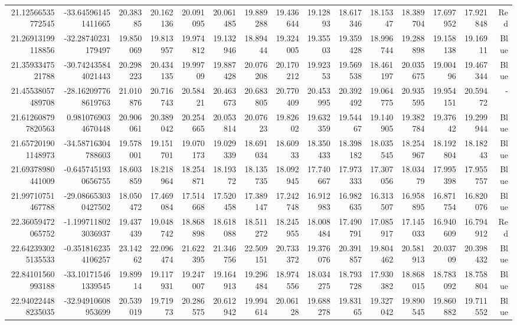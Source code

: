 \begin{center}
\begin{longtable}{rrrrrrrrrrrrrrr}
21.12566535772545 & -33.645961451411665 & 20.38385 & 20.162136 & 20.091095 & 20.061485 & 19.889288 & 19.436644 & 19.12893 & 18.617346 & 18.15347 & 18.389704 & 17.697952 & 17.921848 & Red \\
21.26913199118856 & -32.28740231179497 & 19.850069 & 19.813957 & 19.974812 & 19.132946 & 18.89444 & 19.324005 & 19.35503 & 19.359428 & 18.996744 & 19.288898 & 19.158138 & 19.16911 & Blue \\
21.3593347521788 & -30.742435844021443 & 20.298223 & 20.434135 & 19.99709 & 19.887428 & 20.076208 & 20.170212 & 19.92353 & 19.569538 & 18.461197 & 20.035675 & 19.00496 & 19.467344 & Blue \\
21.45538057489708 & -28.162097768619763 & 21.010876 & 20.716743 & 20.58421 & 20.463673 & 20.683805 & 20.770409 & 20.453995 & 20.392492 & 19.064775 & 20.935595 & 19.954151 & 20.59472 & - \\
21.612608797820563 & 0.9810769034670448 & 20.906061 & 20.389042 & 20.254665 & 20.053814 & 20.07623 & 19.82602 & 19.632359 & 19.54467 & 19.140905 & 19.382784 & 19.37642 & 19.299944 & Blue \\
21.657201901148973 & -34.58716304788603 & 19.578001 & 19.151701 & 19.070173 & 19.029339 & 18.691034 & 18.60933 & 18.350433 & 18.398182 & 18.035545 & 18.254967 & 18.192804 & 18.18243 & Blue \\
21.69378980441009 & -0.6457451930656755 & 18.603859 & 18.218964 & 18.254871 & 18.19372 & 18.135735 & 18.092945 & 17.740667 & 17.973333 & 17.307056 & 18.03479 & 17.995398 & 17.955757 & Blue \\
21.99710751467788 & -29.086653030427502 & 18.050472 & 17.469084 & 17.514668 & 17.520458 & 17.389147 & 17.242748 & 16.912983 & 16.982635 & 16.313507 & 16.958895 & 16.871754 & 16.820076 & Blue \\
22.36059472065752 & -1.1997118023036937 & 19.437439 & 19.048742 & 18.868898 & 18.618088 & 18.511272 & 18.245955 & 18.008484 & 17.490791 & 17.085917 & 17.145033 & 16.940609 & 16.794912 & Red \\
22.642393025135533 & -0.3518162354106257 & 23.14262 & 22.096474 & 21.622395 & 21.346756 & 22.509151 & 20.733372 & 19.376076 & 20.391857 & 19.804462 & 20.581913 & 20.03709 & 20.398432 & Blue \\
22.84101560993188 & -33.101715461339545 & 19.89914 & 19.117931 & 19.247007 & 19.164913 & 19.296484 & 18.974556 & 18.034275 & 18.793728 & 17.930382 & 18.868015 & 18.783092 & 18.758804 & Blue \\
22.940224488235035 & -32.94910608953699 & 20.539019 & 19.71973 & 20.286575 & 20.612942 & 19.994614 & 20.06128 & 19.688278 & 19.83165 & 19.327042 & 19.890545 & 19.860882 & 19.711552 & Blue \\

\end{longtable}
\end{center}
